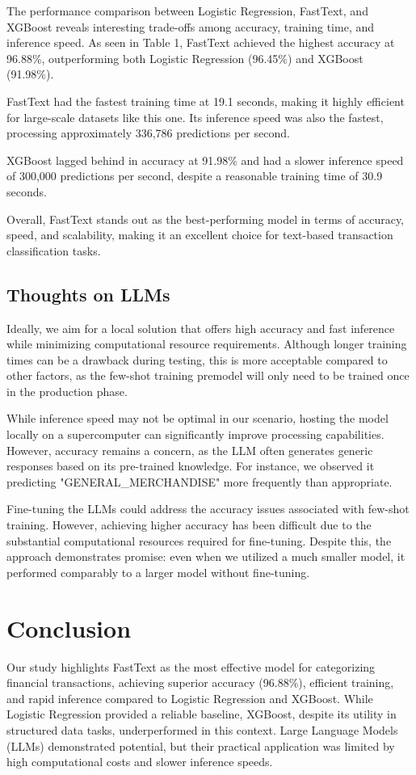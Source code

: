 \documentclass[12pt,letterpaper]{article}
\begin{document}
The performance comparison between Logistic Regression, FastText, and XGBoost reveals interesting trade-offs among accuracy, training time, and inference speed. As seen in Table 1, FastText achieved the highest accuracy at 96.88\%, outperforming both Logistic Regression (96.45\%) and XGBoost (91.98\%).

FastText had the fastest training time at 19.1 seconds, making it highly efficient for large-scale datasets like this one. Its inference speed was also the fastest, processing approximately 336,786 predictions per second.

XGBoost lagged behind in accuracy at 91.98\% and had a slower inference speed of 300,000 predictions per second, despite a reasonable training time of 30.9 seconds.

Overall, FastText stands out as the best-performing model in terms of accuracy, speed, and scalability, making it an excellent choice for text-based transaction classification tasks.


\subsection{Thoughts on LLMs}

Ideally, we aim for a local solution that offers high accuracy and fast inference while minimizing computational resource requirements. Although longer training times can be a drawback during testing, this is more acceptable compared to other factors, as the few-shot training premodel will only need to be trained once in the production phase.

 While inference speed may not be optimal in our scenario, hosting the model locally on a supercomputer can significantly improve processing capabilities. However, accuracy remains a concern, as the LLM often generates generic responses based on its pre-trained knowledge. For instance, we observed it predicting "GENERAL\_MERCHANDISE" more frequently than appropriate.
 
Fine-tuning the LLMs could address the accuracy issues associated with few-shot training. However, achieving higher accuracy has been difficult due to the substantial computational resources required for fine-tuning. Despite this, the approach demonstrates promise: even when we utilized a much smaller model, it performed comparably to a larger model without fine-tuning.


\section{Conclusion}
Our study highlights FastText as the most effective model for categorizing financial transactions, achieving superior accuracy (96.88\%), efficient training, and rapid inference compared to Logistic Regression and XGBoost. While Logistic Regression provided a reliable baseline, XGBoost, despite its utility in structured data tasks, underperformed in this context. Large Language Models (LLMs) demonstrated potential, but their practical application was limited by high computational costs and slower inference speeds.  
\end{document}
